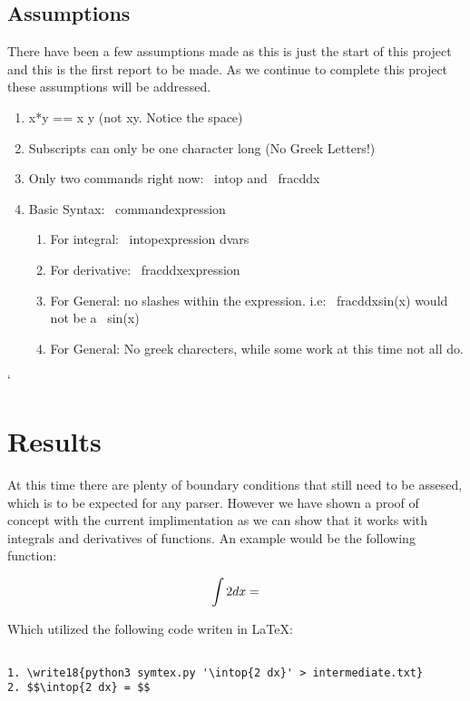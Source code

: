 \documentclass[english]{article}
\begin{document}
\subsection{Assumptions}

There have been a few assumptions made as this is just the start of this project and this is the first report to be made. As we continue to complete this project these assumptions will be addressed.

\begin{enumerate}
  \item {x*y == x y (not xy. Notice the space)}
  \item {Subscripts can only be one character long (No Greek Letters!)}
  \item {Only two commands right now: \ intop and \ frac{d}{dx}}
  \item {Basic Syntax: \ command{expression}}
  \begin{enumerate}
    \item {For integral: \ intop{expression dvars}}
    \item {For derivative: \ frac{d}{dx}{expression}}
    \item {For General: no slashes within the expression. i.e: \ frac{d}{dx}{sin(x)} would not be a \ sin(x)}
    \item {For General: No greek charecters, while some work at this time not all do.}
  \end{enumerate}
\end{enumerate}`

\section{Results}

At this time there are plenty of boundary conditions that still need to be assesed, which is to be expected for any parser. However we have shown a proof of concept with the current implimentation as we can show that it works with integrals and derivatives of functions. An example would be the following function:

$$\intop{2 dx} = $$

Which utilized the following code writen in \LaTeX:

\begin{lstlisting}

1. \write18{python3 symtex.py '\intop{2 dx}' > intermediate.txt}
2. $$\intop{2 dx} = $$

\end{lstlisting}
\end{document}
